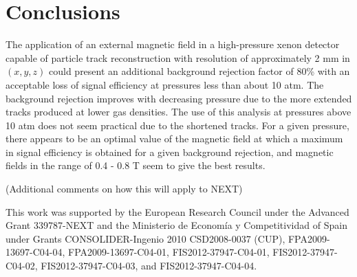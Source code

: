 \documentclass{JINST}
\begin{document}
\section{Conclusions}
The application of an external magnetic field in a high-pressure xenon detector capable of particle track reconstruction with resolution of approximately 2 mm in $(x,y,z)$ could present an additional background rejection factor of 80\% with an acceptable loss of signal efficiency at pressures less than about 10 atm.  The background rejection improves with decreasing pressure due to the more extended tracks produced at lower gas densities.  The use of this analysis at pressures above 10 atm does not seem practical due to the shortened tracks.  For a given pressure, there appears to be an optimal value of the magnetic field at which a maximum in signal efficiency is obtained for a given background rejection, and magnetic fields in the range of 0.4 - 0.8 T seem to give the best results.



(Additional comments on how this will apply to NEXT)





\acknowledgments

This work was supported by the European Research Council under the Advanced Grant 339787-NEXT and the Ministerio de Econom\'{i}a y Competitividad of Spain under Grants CONSOLIDER-Ingenio 2010 CSD2008-0037 (CUP), FPA2009-13697-C04-04, FPA2009-13697-C04-01, FIS2012-37947-C04-01, FIS2012-37947-C04-02, FIS2012-37947-C04-03, and FIS2012-37947-C04-04.


\end{document}
